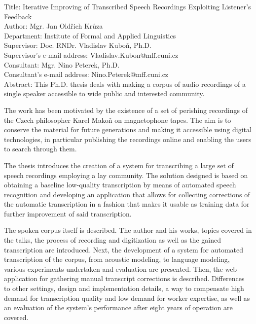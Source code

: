 \noindent
Title: Iterative Improving of Transcribed Speech Recordings Exploiting Listener's Feedback\\
Author: Mgr. Jan Oldřich Krůza\\
Department: Institute of Formal and Applied Linguistics\\
Supervisor: Doc. RNDr. Vladislav Kuboň, Ph.D.\\
Supervisor's e-mail address: Vladislav.Kubon@mff.cuni.cz\\
Consultant: Mgr. Nino Peterek, Ph.D.\\
Consultant's e-mail address: Nino.Peterek@mff.cuni.cz\\

\noindent Abstract:  This Ph.D. thesis deals with making a corpus of audio
recordings of a single speaker accessible to wide public and interested community.

The work has been motivated by the existence of a set of perishing recordings
of the Czech philosopher Karel Makoň on magnetophone tapes. The aim is to conserve
the material for future generations and making it accessible using
digital technologies, in particular publishing the recordings online
and enabling the users to search through them.

The thesis introduces the creation of a system for transcribing a large set of
speech recordings employing a lay community. The solution designed is based on
obtaining a baseline low-quality transcription by means of automated speech
recognition and developing an application that allows for collecting corrections
of the automatic transcription in a fashion that makes it usable as training
data for further improvement of said transcription.

The spoken corpus itself is described. The
author and his works, topics covered in the talks, the process of recording
and digitization as well as the gained transcription are introduced.
Next, the development of a system for automated transcription of
the corpus, from acoustic modeling, to language modeling, various experiments
undertaken and evaluation are presented. Then, the web application for gathering
manual transcript corrections is described.
Differences to other settings, design and implementation details, a way to
compensate high demand for transcription quality and low demand for worker
expertise, as well as an evaluation of the system's performance after eight
years of operation are covered.

